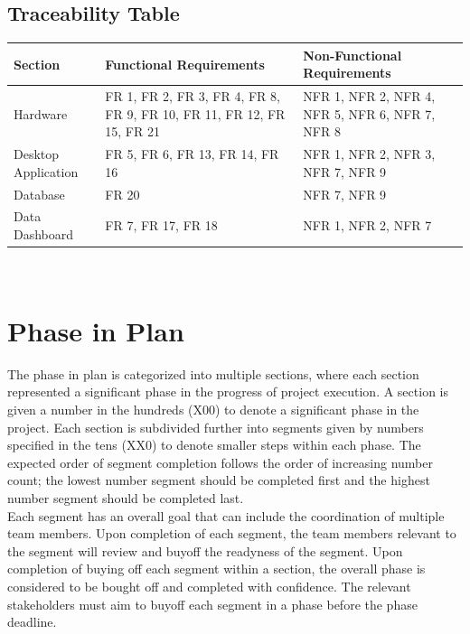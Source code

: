 \documentclass[12pt]{article}
\begin{document}
\subsection{Traceability Table}

  \begin{tabular}{| p{} | p{}| p{}|}
    \hline
    \rowcolor[gray]{0.9}
    Section & Functional Requirements & Non-Functional Requirements\\
    \hline
    Hardware & FR 1, FR 2, FR 3, FR 4, FR 8, FR 9, FR 10, FR 11, FR 12, FR 15, FR 21 & NFR 1, NFR 2, NFR 4, NFR  5, NFR 6, NFR 7, NFR 8 \\
    \hline
    Desktop Application & FR 5, FR 6, FR 13, FR 14, FR 16 & NFR 1, NFR 2, NFR 3, NFR 7, NFR 9\\
    \hline
    Database & FR 20 & NFR 7, NFR 9\\
    \hline
    Data Dashboard & FR 7, FR 17, FR 18 & NFR 1, NFR 2, NFR 7\\
    \hline
  \end{tabular}
\\


\section{Phase in Plan}

The phase in plan is categorized into multiple sections, where each section represented a significant phase in the progress of project execution. A section is given a number in the hundreds (X00) to denote a significant phase in the project. Each section is subdivided further into segments given by numbers specified in the tens (XX0) to denote smaller steps within each phase. The expected order of segment completion follows the order of increasing number count; the lowest number segment should be completed first and the highest number segment should be completed last.\\

Each segment has an overall goal that can include the coordination of multiple team members. Upon completion of each segment, the team members relevant to the segment will review and buyoff the readyness of the segment. Upon completion of buying off each segment within a section, the overall phase is considered to be bought off and completed with confidence. The relevant stakeholders must aim to buyoff each segment in a phase before the phase deadline.\\
\end{document}
